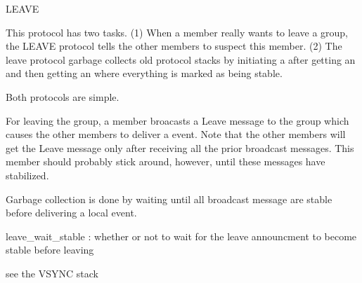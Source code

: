\begin{Layer}{LEAVE}

This protocol has two tasks.  (1) When a member really wants to leave a group,
the LEAVE protocol tells the other members to suspect this member.  (2) The
leave protocol garbage collects old protocol stacks by initiating a 
after getting an  and then getting an  where everything is
marked as being stable.

\begin{Protocol}
Both protocols are simple.

For leaving the group, a member broacasts a Leave message to the group
which causes the other members to deliver a  event.  Note that
the other members will get the Leave message only after receiving all the
prior broadcast messages.  This member should probably stick around,
however, until these messages have stabilized.

Garbage collection is done by waiting until all broadcast message are
stable before delivering a local  event.
\end{Protocol}

\begin{Parameters}
\item
leave\_wait\_stable : whether or not to wait for the leave announcment to
become stable before leaving
\end{Parameters}

\begin{Properties}
\item \todo{}
\end{Properties}

\begin{Sources}
\end{Sources}

\begin{GenEvent}
\end{GenEvent}

\begin{Testing}
\item see the VSYNC stack
\end{Testing}
\end{Layer}
